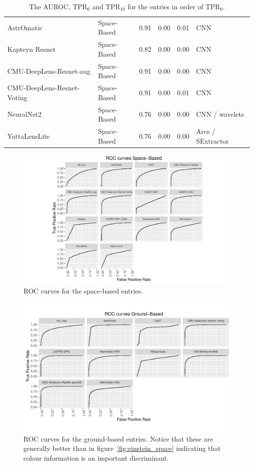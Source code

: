 \documentclass{aa}
\begin{document}
\begin{table}
\begin{tabular}{llrrrl}
   AstrOmatic & Space-Based & 0.91 & 0.00 & 0.01 & CNN \\ 
   Kapteyn Resnet& Space-Based & 0.82 & 0.00 & 0.00 & CNN \\ 
   CMU-DeepLens-Resnet-aug & Space-Based & 0.91 & 0.00 & 0.00 & CNN \\ 
   CMU-DeepLens-Resnet-Voting & Space-Based & 0.91 & 0.00 & 0.01 & CNN \\ 
   NeuralNet2 & Space-Based & 0.76 & 0.00 & 0.00 & CNN / wavelets \\ 
   YattaLensLite & Space-Based & 0.76 & 0.00 & 0.00 & Arcs / SExtractor \\ 
   \hline
\end{tabular}
\caption{The AUROC, TPR$_0$ and TPR$_{10}$ for the entries in order of TPR$_0$.  }
\label{table:TPR0}
\end{table}

\begin{figure}
 \includegraphics[width=2\columnwidth]{figures/roc_space.pdf}
 \caption{ROC curves for the space-based entries.}
 \label{fig:roc_space}
\end{figure}

\begin{figure}
 \includegraphics[width=2\columnwidth]{figures/roc_ground.pdf}
 \caption{ROC curves for the ground-based entries.  Notice that these are generally better than in figure~\ref{fig:einstein_space} indicating that colour information is an important discriminant. }
 \label{fig:roc_ground}
\end{figure}
\end{document}
